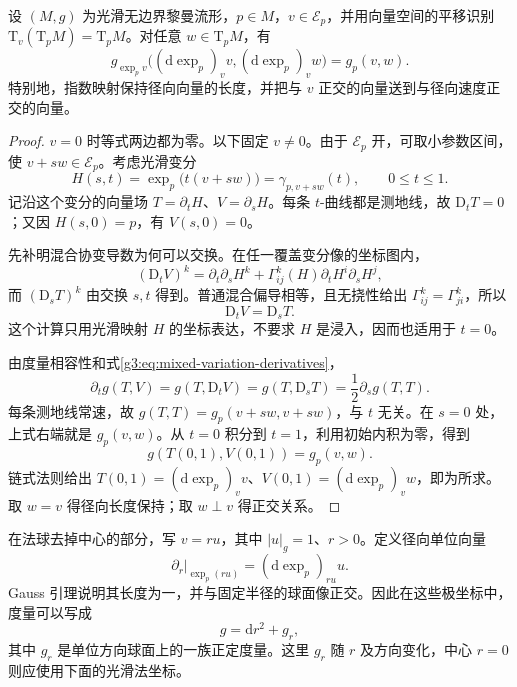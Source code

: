 \begin{lemma}[Gauss 引理]\label{g3:lem:gauss}
	设 \((M,g)\) 为光滑无边界黎曼流形，\(p\in M\)，\(v\in\mathcal E_p\)，并用向量空间的平移识别 \(\mathrm{T}_v(\mathrm{T}_pM)=\mathrm{T}_pM\)。对任意 \(w\in\mathrm{T}_pM\)，有
	\begin{equation}\label{g3:eq:gauss-lemma}
		g_{\exp_pv}\bigl((\mathrm{d}\exp_p)_vv,(\mathrm{d}\exp_p)_vw\bigr)
		=g_p(v,w).
	\end{equation}
	特别地，指数映射保持径向向量的长度，并把与 \(v\) 正交的向量送到与径向速度正交的向量。
\end{lemma}
\begin{proof}
	\(v=0\) 时等式两边都为零。以下固定 \(v\ne0\)。由于 \(\mathcal E_p\) 开，可取小参数区间，使 \(v+sw\in\mathcal E_p\)。考虑光滑变分
	\[
		H(s,t)=\exp_p\bigl(t(v+sw)\bigr)=\gamma_{p,v+sw}(t),
		\qquad 0\le t\le1.
	\]
	记沿这个变分的向量场 \(T=\partial_tH\)、\(V=\partial_sH\)。每条 \(t\)-曲线都是测地线，故 \(\mathrm{D}_tT=0\)；又因 \(H(s,0)=p\)，有 \(V(s,0)=0\)。

	先补明混合协变导数为何可以交换。在任一覆盖变分像的坐标图内，
	\[
		(\mathrm{D}_tV)^k
		=\partial_t\partial_sH^k+\Gamma^k_{ij}(H)\partial_tH^i\partial_sH^j,
	\]
	而 \((\mathrm{D}_sT)^k\) 由交换 \(s,t\) 得到。普通混合偏导相等，且无挠性给出 \(\Gamma^k_{ij}=\Gamma^k_{ji}\)，所以
	\begin{equation}\label{g3:eq:mixed-variation-derivatives}
		\mathrm{D}_tV=\mathrm{D}_sT.
	\end{equation}
	这个计算只用光滑映射 \(H\) 的坐标表达，不要求 \(H\) 是浸入，因而也适用于 \(t=0\)。

	由度量相容性和式\eqref{g3:eq:mixed-variation-derivatives}，
	\[
		\partial_t g(T,V)
		=g(T,\mathrm{D}_tV)
		=g(T,\mathrm{D}_sT)
		=\frac12\partial_s g(T,T).
	\]
	每条测地线常速，故 \(g(T,T)=g_p(v+sw,v+sw)\)，与 \(t\) 无关。在 \(s=0\) 处，上式右端就是 \(g_p(v,w)\)。从 \(t=0\) 积分到 \(t=1\)，利用初始内积为零，得到
	\[
		g(T(0,1),V(0,1))=g_p(v,w).
	\]
	链式法则给出 \(T(0,1)=(\mathrm{d}\exp_p)_vv\)、\(V(0,1)=(\mathrm{d}\exp_p)_vw\)，即为所求。取 \(w=v\) 得径向长度保持；取 \(w\perp v\) 得正交关系。
\end{proof}

在法球去掉中心的部分，写 \(v=ru\)，其中 \(|u|_g=1\)、\(r>0\)。定义径向单位向量
\[
	\partial_r\big|_{\exp_p(ru)}=(\mathrm{d}\exp_p)_{ru}u.
\]
Gauss 引理说明其长度为一，并与固定半径的球面像正交。因此在这些极坐标中，度量可以写成
\[
	g=\mathrm{d}r^2+g_r,
\]
其中 \(g_r\) 是单位方向球面上的一族正定度量。这里 \(g_r\) 随 \(r\) 及方向变化，中心 \(r=0\) 则应使用下面的光滑法坐标。

